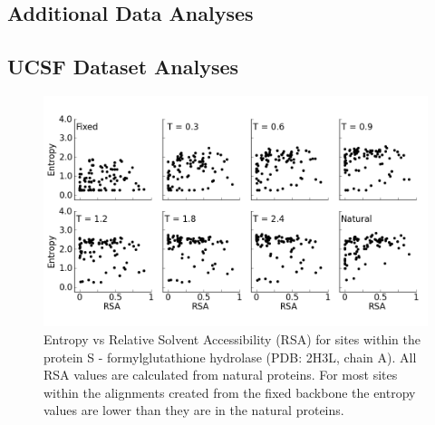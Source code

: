 \documentclass[12pt]{article}
\begin{document}
\subsection{Additional Data Analyses}


\subsection{UCSF Dataset Analyses}
\label{UCSF}

\begin{figure}[H]
\centering
\centerline{\includegraphics[width = 6.5in]{figures/RSA_vs_Entropy_2H3L_Combination_Plot_Noah.png}}
\caption{Entropy vs Relative Solvent Accessibility (RSA) for sites within the protein S - formylglutathione hydrolase (PDB: 2H3L, chain A). All RSA values are calculated from natural proteins. For most sites within the alignments created from the fixed backbone the entropy values are lower than they are in the natural proteins.}
\label{Entropy_Sites_Noah}
\end{figure}
\end{document}

